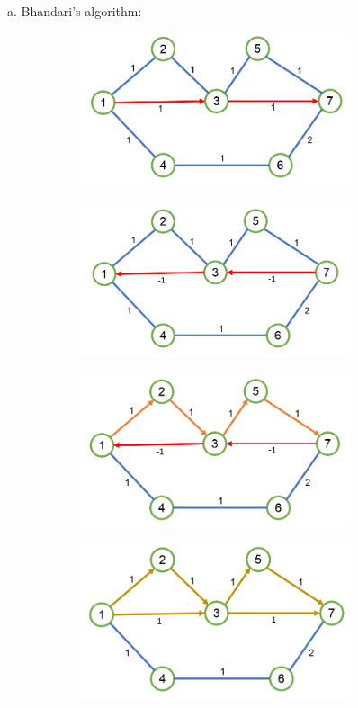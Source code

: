 \documentclass[10pt,letterpaper]{article}
\begin{document}
a. Bhandari's algorithm:
\begin{figure}[h!]
\centering
\begin{subfigure}{0.49\textwidth}
\includegraphics[width=80mm]{PSol6_Q5_1.png}
\end{subfigure}
\begin{subfigure}{0.49\textwidth}
\includegraphics[width=80mm]{PSol6_Q5_2.png}
\end{subfigure}
\begin{subfigure}{0.49\textwidth}
\includegraphics[width=80mm]{PSol6_Q5_3.png}
\end{subfigure}
\begin{subfigure}{0.49\textwidth}
\includegraphics[width=80mm]{PSol6_Q5_4.png}
\end{subfigure}
\end{figure}
\end{document}

